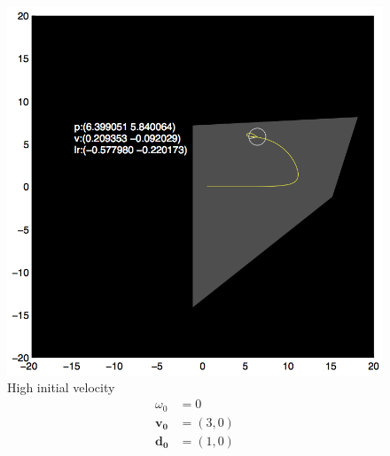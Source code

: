\documentclass{report}
\begin{document}
\begin{figure}
\begin{minipage}[t]{0.45\linewidth}
    \includegraphics[width=\linewidth]{fig2.png}
    \captionsetup{singlelinecheck=off}
    \caption[.]{\label{fig:fig2}High initial velocity \begin{align*}
    \omega_0 &= 0 \\
    \mathbf{v_0} &= (3, 0)\\
    \mathbf{d_0} &= (1, 0)
    \end{align*}
    }\end{minipage}
\end{figure}
\end{document}
